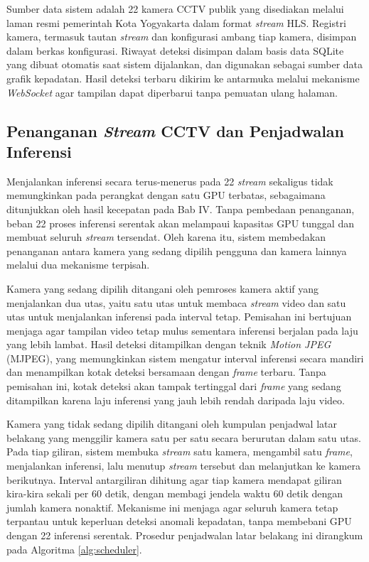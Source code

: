 Sumber data sistem adalah 22 kamera CCTV publik yang disediakan melalui laman resmi 
pemerintah Kota Yogyakarta dalam format \textit{stream} HLS. Registri kamera, termasuk tautan 
\textit{stream} dan konfigurasi ambang tiap kamera, disimpan dalam berkas konfigurasi. Riwayat 
deteksi disimpan dalam basis data SQLite yang dibuat otomatis saat sistem dijalankan, 
dan digunakan sebagai sumber data grafik kepadatan. Hasil deteksi terbaru dikirim ke 
antarmuka melalui mekanisme \textit{WebSocket} agar tampilan dapat diperbarui tanpa 
pemuatan ulang halaman.

\subsection{Penanganan \textit{Stream} CCTV dan Penjadwalan Inferensi}

Menjalankan inferensi secara terus-menerus pada 22 \textit{stream} sekaligus tidak 
memungkinkan pada perangkat dengan satu GPU terbatas, sebagaimana ditunjukkan oleh hasil 
kecepatan pada Bab IV. Tanpa pembedaan penanganan, beban 22 proses inferensi serentak akan 
melampaui kapasitas GPU tunggal dan membuat seluruh \textit{stream} tersendat. Oleh karena 
itu, sistem membedakan penanganan antara kamera yang sedang dipilih pengguna dan kamera 
lainnya melalui dua mekanisme terpisah.

Kamera yang sedang dipilih ditangani oleh pemroses kamera aktif yang menjalankan dua 
utas, yaitu satu utas untuk membaca \textit{stream} video dan satu utas untuk menjalankan 
inferensi pada interval tetap. Pemisahan ini bertujuan menjaga agar tampilan video tetap 
mulus sementara inferensi berjalan pada laju yang lebih lambat. Hasil deteksi ditampilkan 
dengan teknik \textit{Motion JPEG} (MJPEG), yang memungkinkan sistem mengatur interval 
inferensi secara mandiri dan menampilkan kotak deteksi bersamaan dengan \textit{frame} 
terbaru. Tanpa pemisahan ini, kotak deteksi akan tampak tertinggal dari \textit{frame} 
yang sedang ditampilkan karena laju inferensi yang jauh lebih rendah daripada laju video.

Kamera yang tidak sedang dipilih ditangani oleh kumpulan penjadwal latar belakang yang 
menggilir kamera satu per satu secara berurutan dalam satu utas. Pada tiap giliran, 
sistem membuka \textit{stream} satu kamera, mengambil satu \textit{frame}, menjalankan inferensi, 
lalu menutup \textit{stream} tersebut dan melanjutkan ke kamera berikutnya. Interval antargiliran 
dihitung agar tiap kamera mendapat giliran kira-kira sekali per 60 detik, dengan membagi 
jendela waktu 60 detik dengan jumlah kamera nonaktif. Mekanisme ini menjaga agar seluruh 
kamera tetap terpantau untuk keperluan deteksi anomali kepadatan, tanpa membebani GPU 
dengan 22 inferensi serentak. Prosedur penjadwalan latar belakang ini dirangkum pada 
Algoritma \ref{alg:scheduler}.

